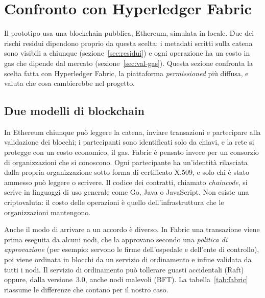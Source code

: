 \section{Confronto con Hyperledger Fabric}\label{sec:fabric}

Il prototipo usa una blockchain pubblica, Ethereum, simulata in locale. Due dei rischi residui dipendono proprio da questa scelta: i metadati scritti sulla catena sono visibili a chiunque (sezione~\ref{sec:residui}) e ogni operazione ha un costo in gas che dipende dal mercato (sezione~\ref{sec:val-gas}). Questa sezione confronta la scelta fatta con Hyperledger Fabric\cite{fabric-paper}, la piattaforma \emph{permissioned} più diffusa, e valuta che cosa cambierebbe nel progetto.

\subsection{Due modelli di blockchain}
In Ethereum chiunque può leggere la catena, inviare transazioni e partecipare alla validazione dei blocchi; i partecipanti sono identificati solo da chiavi, e la rete si protegge con un costo economico, il gas. Fabric è pensato invece per un consorzio di organizzazioni che si conoscono. Ogni partecipante ha un'identità rilasciata dalla propria organizzazione sotto forma di certificato X.509, e solo chi è stato ammesso può leggere o scrivere. Il codice dei contratti, chiamato \emph{chaincode}, si scrive in linguaggi di uso generale come Go, Java o JavaScript. Non esiste una criptovaluta: il costo delle operazioni è quello dell'infrastruttura che le organizzazioni mantengono.

Anche il modo di arrivare a un accordo è diverso. In Fabric una transazione viene prima eseguita da alcuni nodi, che la approvano secondo una \emph{politica di approvazione} (per esempio: servono le firme dell'ospedale e dell'ente di controllo), poi viene ordinata in blocchi da un servizio di ordinamento e infine validata da tutti i nodi. Il servizio di ordinamento può tollerare guasti accidentali (Raft) oppure, dalla versione~3.0, anche nodi malevoli (BFT)\cite{fabric-docs}. La tabella~\ref{tab:fabric} riassume le differenze che contano per il nostro caso.

